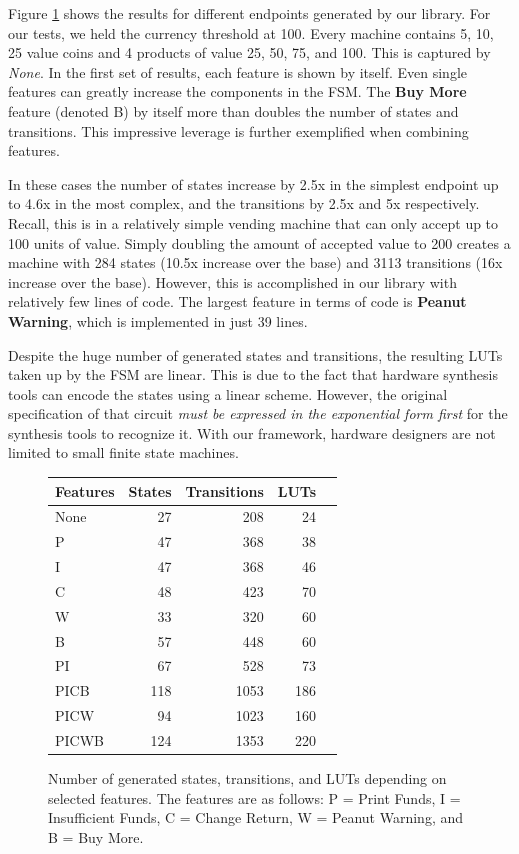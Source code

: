 \documentclass[sigplan,anonymous, review]{acmart}
\begin{document}
Figure \ref{fig:vmData} shows the results for different endpoints generated by our library. For our tests, we held the currency threshold at 100. Every machine contains 5, 10, 25 value coins and 4 products of value 25, 50, 75, and 100. This is captured by \textit{None}. In the first set of results, each feature is shown by itself. Even single features can greatly increase the components in the FSM. The \textbf{Buy More} feature (denoted B) by itself more than doubles the number of states and transitions. This impressive leverage is further exemplified when combining features. 

In these cases the number of states increase by 2.5x in the simplest endpoint up to 4.6x in the most complex, and the transitions by 2.5x and 5x respectively. Recall, this is in a relatively simple vending machine that can only accept up to 100 units of value. Simply doubling the amount of accepted value to 200 creates a machine with 284 states (10.5x increase over the base) and 3113 transitions (16x increase over the base). However, this is accomplished in our library with relatively few lines of code. The largest feature in terms of code is \textbf{Peanut Warning}, which is implemented in just 39 lines. 

Despite the huge number of generated states and transitions, the resulting LUTs taken up by the FSM are linear. This is due to the fact that hardware synthesis tools can encode the states using a linear scheme. However, the original specification of that circuit \textit{must be expressed in the exponential form first} for the synthesis tools to recognize it. With our framework, hardware designers are not limited to small finite state machines.

\begin{figure}
    \centering
\begin{tabular}{lrrrr}\toprule
Features &States &Transitions &LUTs \\\midrule
None &27 &208 &24 \\
P &47 &368 &38 \\
I &47 &368 &46 \\
C &48 &423 &70 \\
W &33 &320 &60 \\
B &57 &448 &60 \\
PI &67 &528 &73 \\
PICB &118 &1053 &186 \\
PICW &94 &1023 &160 \\
PICWB &124 &1353 &220 \\
\bottomrule
\end{tabular}
    \caption{Number of generated states, transitions, and LUTs depending on selected features. The features are as follows: P = Print Funds, I = Insufficient Funds, C = Change Return, W = Peanut Warning, and B = Buy More.}
    \label{fig:vmData}
\end{figure}
\end{document}
